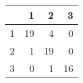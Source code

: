 \begin{tabular}{rrrr}
  \hline
 & 1 & 2 & 3 \\ 
  \hline
1 &  19 &   4 &   0 \\ 
  2 &   1 &  19 &   0 \\ 
  3 &   0 &   1 &  16 \\ 
   \hline
\end{tabular}

